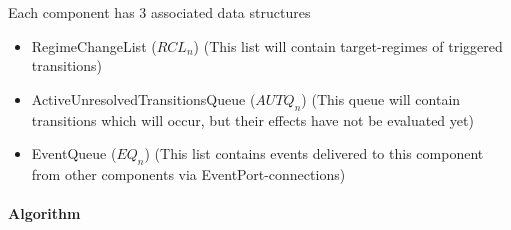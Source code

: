 \documentclass{article}
\begin{document}
\newcommand{\RCLn}{$RCL_n$}
\newcommand{\AUTQn}{$AUTQ_n$}
\newcommand{\EQn}{$EQ_n$}

\noindent Each component has 3 associated data structures
\begin{itemize}
\item RegimeChangeList (\RCLn) (This list will contain target-regimes of
triggered transitions)
\item ActiveUnresolvedTransitionsQueue (\AUTQn) (This queue will
contain transitions which will occur, but their effects have not be
evaluated yet)
\item EventQueue (\EQn) (This list contains events delivered to this
component from other components via EventPort-connections)
\end{itemize}

\paragraph{Algorithm}
\end{document}
